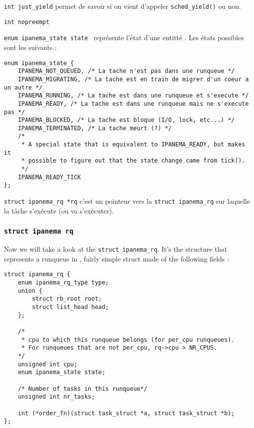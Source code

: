 \par \texttt{int just\_yield} permet de savoir si on vient d'appeler \texttt{sched\_yield()} ou non.\\
\par \texttt{int nopreempt}

\par \texttt{enum ipanema\_state state } représente l'état d'une entitté \ipa. Les états possibles sont les suivants :
\begin{lstlisting}[style=CStyle]
enum ipanema_state {
	IPANEMA_NOT_QUEUED, /* La tache n'est pas dans une runqueue */
	IPANEMA_MIGRATING, /* La tache est en train de migrer d'un coeur a un autre */
	IPANEMA_RUNNING, /* La tache est dans une runqueue et s'execute */
	IPANEMA_READY, /* La tache est dans une runqueue mais ne s'execute pas */
	IPANEMA_BLOCKED, /* La tache est bloque (I/O, lock, etc...) */
	IPANEMA_TERMINATED, /* La tache meurt (?) */
	/*
	 * A special state that is equivalent to IPANEMA_READY, but makes it
	 * possible to figure out that the state change came from tick().
	 */
	IPANEMA_READY_TICK
};
\end{lstlisting}

\par \texttt{struct ipanema\_rq *rq} c'est un pointeur vers la \texttt{struct ipanema\_rq} sur laquelle la tâche s'exécute (ou va s'exécuter).

\subsubsection{\texttt{struct ipanema rq}}
Now we will take a look at the \texttt{struct ipanema\_rq}. It's the structure that represents a runqueue in \ipa, fairly simple struct made of the following fields :

\begin{lstlisting}[style=CStyle]
struct ipanema_rq {
	enum ipanema_rq_type type;
	union {
		struct rb_root root;
		struct list_head head;
	};

	/*
	 * cpu to which this runqueue belongs (for per_cpu runqueues).
	 * For runqueues that are not per_cpu, rq->cpu > NR_CPUS.
	*/
	unsigned int cpu;
	enum ipanema_state state;

	/* Number of tasks in this runqueue*/
	unsigned int nr_tasks;

	int (*order_fn)(struct task_struct *a, struct task_struct *b);
};
\end{lstlisting}

